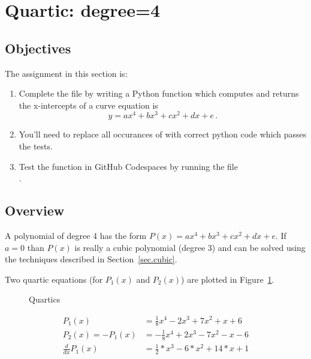 \section{Quartic: degree=4}
\label{sec.quartic}

\subsection{Objectives}
The assignment in this section is:
\begin{enumerate}
\item Complete the file  by writing a Python
  function which computes and returns the x-intercepts of a curve
  equation is \[y=a x^4 + b x^3 + c x^2 + d x + e\,.\]
\item You'll need to replace all occurances of 
  with correct python code which passes the tests.
\item Test the function in GitHub Codespaces by running the file\\
  .
\end{enumerate}

\subsection{Overview}


A polynomial of degree 4 has the form $P(x) = a x^4 + b x^3 + c x^2 + d x + e$. If $a=0$ than $P(x)$ is really
a cubic polynomial (degree 3) and can be solved using the techniques described in Section~\ref{sec.cubic}.

Two quartic equations (for $P_1(x)$ and $P_2(x)$) are plotted in Figure~\ref{fig.quartic}.

\begin{figure}
\centering

\caption{Quartics}
\label{fig.quartic}
\end{figure}

\begin{align*}
  P_1(x) &= \frac{1}{8}  x^4 -2 x^3 + 7  x^2 + x + 6\\
  P_2(x) = -P_1(x) &= -\frac{1}{8}  x^4 +2 x^3 - 7  x^2 - x - 6\\
  \frac{d}{dx} P_1(x) &= \frac{1}{2} * x^3 -6* x^2 + 14 * x + 1
\end{align*}
